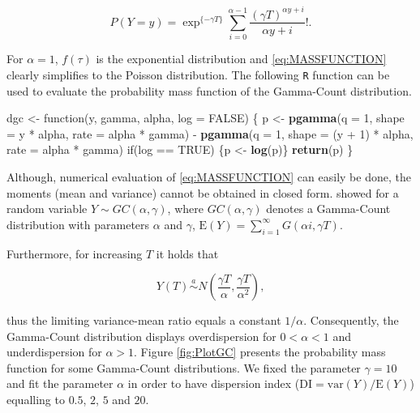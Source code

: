 \documentclass[9pt,a5paper,]{book}
\newenvironment{Shaded}{}{}
\newcommand{\KeywordTok}[1]{\textbf{{#1}}}
\newcommand{\DataTypeTok}[1]{\underline{{#1}}}
\newcommand{\DecValTok}[1]{{#1}}
\newcommand{\StringTok}[1]{{#1}}
\newcommand{\OtherTok}[1]{{#1}}
\newcommand{\NormalTok}[1]{{#1}}
\renewenvironment{Shaded}{\color{inputcolor}}{}
\renewcommand{\DataTypeTok}[1]{{#1}}
\theoremstyle{definition}
\theoremstyle{definition}
\theoremstyle{remark}
\begin{document}
\begin{equation}
P(Y = y) = \exp^{\{-\gamma T\}} \sum_{i = 0}^{\alpha -1} \frac{(\gamma T)^{\alpha y + i}}{\alpha y + i}!.
\end{equation}

For \(\alpha = 1\), \(f(\tau)\) is the exponential distribution and
\eqref{eq:MASSFUNCTION} clearly simplifies to the Poisson distribution.
The following \texttt{R} function can be used to evaluate the
probability mass function of the Gamma-Count distribution.

\begin{Shaded}
\begin{Highlighting}[]
\NormalTok{dgc <-}\StringTok{ }\NormalTok{function(y, gamma, alpha, }\DataTypeTok{log =} \OtherTok{FALSE}\NormalTok{) \{}
  \NormalTok{p <-}\StringTok{ }\KeywordTok{pgamma}\NormalTok{(}\DataTypeTok{q =} \DecValTok{1}\NormalTok{,}
              \DataTypeTok{shape =} \NormalTok{y *}\StringTok{ }\NormalTok{alpha,}
              \DataTypeTok{rate =} \NormalTok{alpha *}\StringTok{ }\NormalTok{gamma) -}
\StringTok{    }\KeywordTok{pgamma}\NormalTok{(}\DataTypeTok{q =} \DecValTok{1}\NormalTok{,}
           \DataTypeTok{shape =} \NormalTok{(y +}\StringTok{ }\DecValTok{1}\NormalTok{) *}\StringTok{ }\NormalTok{alpha,}
           \DataTypeTok{rate =} \NormalTok{alpha *}\StringTok{ }\NormalTok{gamma)}
  \NormalTok{if(log ==}\StringTok{ }\OtherTok{TRUE}\NormalTok{) \{p <-}\StringTok{ }\KeywordTok{log}\NormalTok{(p)\}}
  \KeywordTok{return}\NormalTok{(p)}
\NormalTok{\}}
\end{Highlighting}
\end{Shaded}

Although, numerical evaluation of \eqref{eq:MASSFUNCTION} can easily be
done, the moments (mean and variance) cannot be obtained in closed form.
\citet{Winkelman1995} showed for a random variable
\(Y \sim GC(\alpha, \gamma)\), where \(GC(\alpha, \gamma)\) denotes a
Gamma-Count distribution with parameters \(\alpha\) and \(\gamma\),
\(\mathrm{E}(Y) = \sum_{i = 1}^\infty G(\alpha i, \gamma T)\).

Furthermore, for increasing \(T\) it holds that

\begin{equation}
Y(T) \overset{a}{\sim} N\left(\frac{\gamma T}{\alpha}, \frac{\gamma T}{\alpha^2} \right),
\end{equation}

thus the limiting variance-mean ratio equals a constant \(1/\alpha\).
Consequently, the Gamma-Count distribution displays overdispersion for
\(0 < \alpha < 1\) and underdispersion for \(\alpha > 1\). Figure
\ref{fig:PlotGC} presents the probability mass function for some
Gamma-Count distributions. We fixed the parameter \(\gamma = 10\) and
fit the parameter \(\alpha\) in order to have dispersion index
(\(\mathrm{DI} = \mathrm{var}(Y)/\mathrm{E}(Y)\)) equalling to \(0.5\),
\(2\), \(5\) and \(20\).
\end{document}
